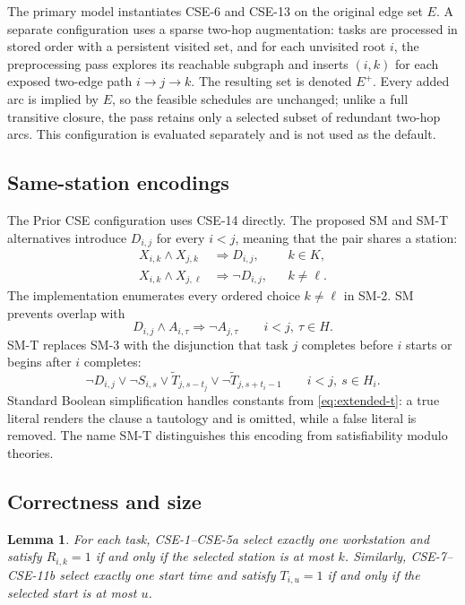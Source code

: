\documentclass[]{interact}
\theoremstyle{plain}
\newtheorem{lemma}[theorem]{Lemma}
\theoremstyle{definition}
\theoremstyle{remark}
\newcommand{\Eaug}{E^{+}}
\begin{document}
The primary model instantiates CSE-6 and CSE-13 on the original edge set $E$. A separate configuration uses a sparse two-hop augmentation: tasks are processed in stored order with a persistent visited set, and for each unvisited root $i$, the preprocessing pass explores its reachable subgraph and inserts $(i,k)$ for each exposed two-edge path $i\to j\to k$. The resulting set is denoted $\Eaug$. Every added arc is implied by $E$, so the feasible schedules are unchanged; unlike a full transitive closure, the pass retains only a selected subset of redundant two-hop arcs. This configuration is evaluated separately and is not used as the default.

\subsection{Same-station encodings}
\label{sec:sm}

The Prior CSE configuration uses CSE-14 directly. The proposed SM and SM-T alternatives introduce $D_{i,j}$ for every $i<j$, meaning that the pair shares a station:
\begin{align}
X_{i,k}\wedge X_{j,k}&\Rightarrow D_{i,j}, && k\in K, \tag{SM-1}\\
X_{i,k}\wedge X_{j,\ell}&\Rightarrow\neg D_{i,j}, && k\neq\ell. \tag{SM-2}
\end{align}
The implementation enumerates every ordered choice $k\neq\ell$ in SM-2. SM prevents overlap with
\begin{equation}
D_{i,j}\wedge A_{i,\tau}\Rightarrow\neg A_{j,\tau}
\qquad i<j,\ \tau\in H.
\tag{SM-3}
\end{equation}
SM-T replaces SM-3 with the disjunction that task $j$ completes before $i$ starts or begins after $i$ completes:
\begin{equation}
\neg D_{i,j}\vee\neg S_{i,s}\vee
\widetilde T_{j,s-t_j}\vee
\neg\widetilde T_{j,s+t_i-1}
\qquad i<j,\ s\in H_i.
\tag{SM-T}
\label{eq:smt}
\end{equation}
Standard Boolean simplification handles constants from \eqref{eq:extended-t}: a true literal renders the clause a tautology and is omitted, while a false literal is removed. The name SM-T distinguishes this encoding from satisfiability modulo theories.

\subsection{Correctness and size}

\begin{lemma}
For each task, CSE-1--CSE-5a select exactly one workstation and satisfy $R_{i,k}=1$ if and only if the selected station is at most $k$. Similarly, CSE-7--CSE-11b select exactly one start time and satisfy $T_{i,u}=1$ if and only if the selected start is at most $u$.
\end{lemma}
\end{document}
